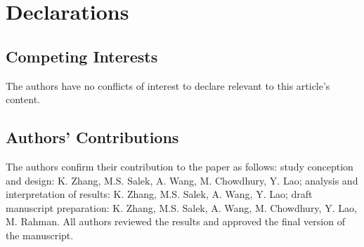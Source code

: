\section*{Declarations }
\subsection*{Competing Interests}
The authors have no conflicts of interest to declare relevant to this article's content.
\subsection*{Authors' Contributions}
The authors confirm their contribution to the paper as follows: study conception and design: K. Zhang, M.S. Salek, A. Wang, M. Chowdhury, Y. Lao; analysis and interpretation of results: K. Zhang, M.S. Salek, A. Wang, Y. Lao; draft manuscript preparation: K. Zhang, M.S. Salek, A. Wang, M. Chowdhury, Y. Lao, M. Rahman. All authors reviewed the results and approved the final version of the manuscript.